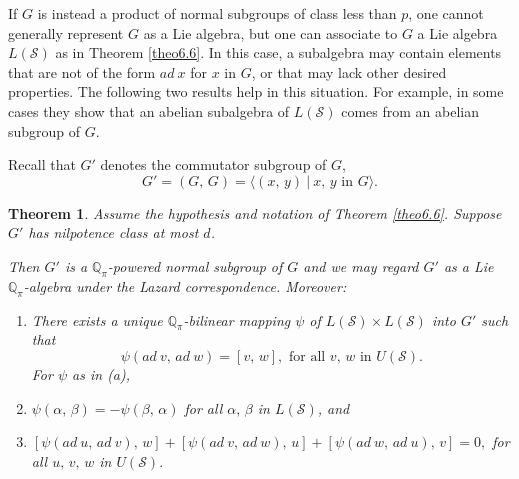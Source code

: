 \documentclass[mathscr]{amsart}
\theoremstyle{theorem}
\newtheorem{theorem}{Theorem}[section]
\theoremstyle{definition}
\numberwithin{equation}{section}
\def\Q{\mathbb{Q}}
\def\S{\mathcal{S}}
\begin{document}
If $G$ is instead a product of normal subgroups of class less than
$p$, one cannot generally represent $G$ as a Lie algebra, but one
can associate to $G$ a Lie algebra $L(\S)$ as in Theorem
\ref{theo6.6}. In this case, a subalgebra may contain elements that
are not of the form $ad\ x$ for $x$ in $G$, or that may lack other
desired properties. The following two results help in this
situation. For example, in some cases they show that an abelian
subalgebra of $L(\S)$ comes from an abelian subgroup of $G.$

Recall that $G'$ denotes the commutator subgroup of $G$,
$$G'=(G,\,G)=\langle(x,\,y)\ |\ x,\,y\text{ in }G\rangle.$$

\begin{theorem}\label{theo6.13}
Assume the hypothesis and notation of Theorem \ref{theo6.6}. Suppose
$G'$ has nilpotence class at most $d$.

Then $G'$ is a $\Q_\pi$-powered normal subgroup of $G$ and we may
regard $G'$ as a Lie $\Q_\pi$-algebra under the Lazard
correspondence. Moreover:
\begin{enumerate}
\item[(a)] There exists a unique $\Q_\pi$-bilinear mapping $\psi$ of
$L(\S)\times L(\S)$ into $G'$ such that
$$\psi(ad\ v,\,ad\ w)=[v,\,w],\text{ for all $v,\,w$ in $U(\S)$}.$$
\hspace{-1.3cm} For $\psi$ as in (a),
\item[(b)] $\psi(\alpha,\,\beta)=-\psi(\beta,\,\alpha)$ for all
$\alpha,\,\beta$ in $L(\S)$, and
\item[(c)] $[\psi(ad\ u,\,ad\ v),\,w]+[\psi(ad\ v,\,ad\ w),\,u]+[\psi(ad\ w,\,ad\ u),\,v]=0,$
for all $u,\,v,\,w$ in $U(\S).$
\end{enumerate}
\end{theorem}
\end{document}
